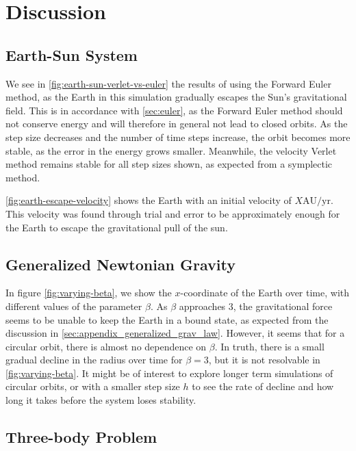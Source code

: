 \documentclass[../main.tex]{subfiles}
\begin{document}
\section{Discussion}\label{sec:discussion}

\subsection{Earth-Sun System}

We see in \cref{fig:earth-sun-verlet-vs-euler} the results of using the Forward Euler method, as the Earth in this simulation gradually escapes the Sun's gravitational field. This is in accordance with \cref{sec:euler}, as the Forward Euler method should not conserve energy and will therefore in general not lead to closed orbits. As the step size decreases and the number of time steps increase, the orbit becomes more stable, as the error in the energy grows smaller. Meanwhile, the velocity Verlet method remains stable for all step sizes shown, as expected from a symplectic method.

\cref{fig:earth-escape-velocity} shows the Earth with an initial velocity of $X \text{AU}/\text{yr}$. This velocity was found through trial and error to be approximately enough for the Earth to escape the gravitational pull of the sun. 

\subsection{Generalized Newtonian Gravity}

In figure \cref{fig:varying-beta}, we show the $x$-coordinate of the Earth over time, with different values of the parameter $\beta$. As $\beta$ approaches $3$, the gravitational force seems to be unable to keep the Earth in a bound state, as expected from the discussion in \cref{sec:appendix_generalized_grav_law}. However, it seems that for a circular orbit, there is almost no dependence on $\beta$. In truth, there is a small gradual decline in the radius over time for $\beta = 3$, but it is not resolvable in \cref{fig:varying-beta}. It might be of interest to explore longer term simulations of circular orbits, or with a smaller step size $h$ to see the rate of decline and how long it takes before the system loses stability.

\subsection{Three-body Problem}
\end{document}
